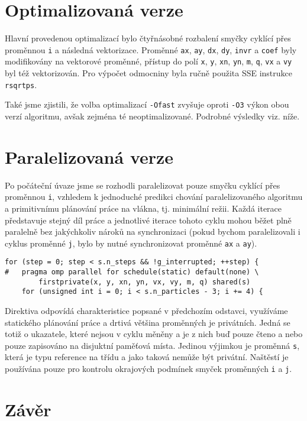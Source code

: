 \documentclass[10pt,a4paper]{article}
\begin{document}
\section{Optimalizovaná verze}

Hlavní provedenou optimalizací bylo čtyřnásobné rozbalení smyčky cyklící přes
proměnnou \texttt{i} a následná vektorizace. Proměnné \texttt{ax}, \texttt{ay},
\texttt{dx}, \texttt{dy}, \texttt{invr} a \texttt{coef} byly modifikovány na
vektorové proměnné, přístup do polí \texttt{x}, \texttt{y}, \texttt{xn},
\texttt{yn}, \texttt{m}, \texttt{q}, \texttt{vx} a \texttt{vy} byl též
vektorizován. Pro výpočet odmocniny byla ručně použita SSE instrukce
\texttt{rsqrtps}.

Také jsme zjistili, že volba optimalizací \texttt{-Ofast} zvyšuje oproti
\texttt{-O3} výkon obou verzí algoritmu, avšak zejména té neoptimalizované.
Podrobné výsledky viz. níže.

\section{Paralelizovaná verze}

Po počáteční úvaze jsme se rozhodli paralelizovat pouze smyčku cyklící
přes proměnnou \texttt{i}, vzhledem k jednoduché predikci chování
paralelizovaného algoritmu a primitivnímu plánování práce na vlákna, tj.
minimální režii. Každá iterace představuje stejný díl práce a jednotlivé
iterace tohoto cyklu mohou běžet plně paralelně bez jakýchkoliv nároků na
synchronizaci (pokud bychom paralelizovali i cyklus proměnné \texttt{j},
bylo by nutné synchronizovat proměnné \texttt{ax} a \texttt{ay}).

\begin{lstlisting}
for (step = 0; step < s.n_steps && !g_interrupted; ++step) {
#   pragma omp parallel for schedule(static) default(none) \
        firstprivate(x, y, xn, yn, vx, vy, m, q) shared(s)
    for (unsigned int i = 0; i < s.n_particles - 3; i += 4) {
\end{lstlisting}

Direktiva odpovídá charakteristice popsané v předchozím odstavci, využíváme
statického plánování práce a drtivá většina proměnných je privátních. Jedná
se totiž o ukazatele, které nejsou v cyklu měněny a je z nich buď pouze čteno
a nebo pouze zapisováno na disjuktní paměťová místa. Jedinou výjimkou je
proměnná \texttt{s}, která je typu reference na třídu a jako taková nemůže
být privátní. Naštěstí je používána pouze pro kontrolu okrajových podmínek
smyček proměnných \texttt{i} a \texttt{j}.

\section{Závěr}
\end{document}
